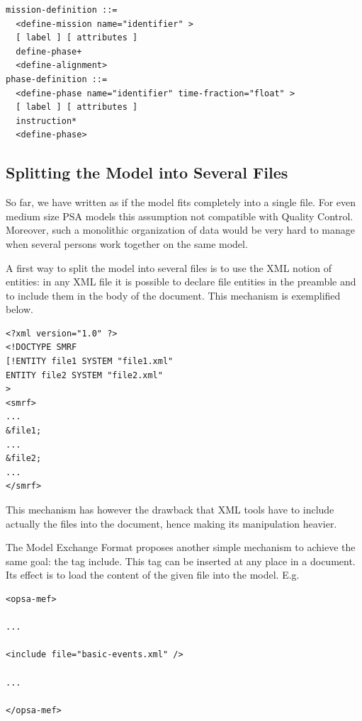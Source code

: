 \documentclass[11pt]{article}
\begin{document}
\begin{lstlisting}
mission-definition ::=
  <define-mission name="identifier" >
  [ label ] [ attributes ]
  define-phase+
  <define-alignment>
phase-definition ::=
  <define-phase name="identifier" time-fraction="float" >
  [ label ] [ attributes ]
  instruction*
  <define-phase>
\end{lstlisting}

\subsection{Splitting the Model into Several Files}
\label{sec:orgae784fd}

So far, we have written as if the model fits completely into a single
file. For even medium size PSA models this assumption not compatible
with Quality Control. Moreover, such a monolithic organization of data
would be very hard to manage when several persons work together on the
same model.

A first way to split the model into several files is to use the XML
notion of entities: in any XML file it is possible to declare file
entities in the preamble and to include them in the body of the
document. This mechanism is exemplified below.


\lstset{language=XML,label= ,caption= ,captionpos=b,numbers=none}
\begin{lstlisting}
<?xml version="1.0" ?>
<!DOCTYPE SMRF
[!ENTITY file1 SYSTEM "file1.xml"
ENTITY file2 SYSTEM "file2.xml"
>
<smrf>
...
&file1;
...
&file2;
...
</smrf>
\end{lstlisting}

This mechanism has however the drawback that XML tools have to include
actually the files into the document, hence making its manipulation
heavier.

The Model Exchange Format proposes another simple mechanism to achieve
the same goal: the tag include. This tag can be inserted at any place in
a document. Its effect is to load the content of the given file into the
model. E.g.

\lstset{language=XML,label= ,caption= ,captionpos=b,numbers=none}
\begin{lstlisting}
<opsa-mef>

...

<include file="basic-events.xml" />

...

</opsa-mef>
\end{lstlisting}
\end{document}
